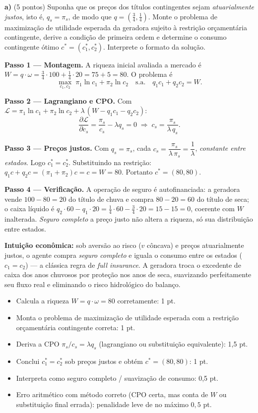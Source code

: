 \textbf{a)} (5 pontos) Suponha que os preços dos títulos contingentes sejam \emph{atuarialmente justos}, isto é, $q_s=\pi_s$, de modo que $q=(\tfrac34,\tfrac14)$. Monte o problema de maximização de utilidade esperada da geradora sujeito à restrição orçamentária contingente, derive a condição de primeira ordem e determine o consumo contingente ótimo $c^{*}=(c_1^{*},c_2^{*})$. Interprete o formato da solução.
\resolucaobox{7.6cm}
\begin{solucao}
\textbf{Passo 1 --- Montagem.} A riqueza inicial avaliada a mercado é $W=q\cdot\omega=\tfrac34\cdot 100+\tfrac14\cdot 20=75+5=80$. O problema é
\[
\max_{c_1,c_2}\;\pi_1\ln c_1+\pi_2\ln c_2\quad\text{s.a.}\quad q_1 c_1+q_2 c_2 = W.
\]

\textbf{Passo 2 --- Lagrangiano e CPO.} Com $\mathcal{L}=\pi_1\ln c_1+\pi_2\ln c_2+\lambda\,(W-q_1 c_1-q_2 c_2)$:
\[
\frac{\partial\mathcal{L}}{\partial c_s}=\frac{\pi_s}{c_s}-\lambda q_s=0\;\Longrightarrow\; c_s=\frac{\pi_s}{\lambda\, q_s}.
\]

\textbf{Passo 3 --- Preços justos.} Com $q_s=\pi_s$, cada $c_s=\dfrac{\pi_s}{\lambda\,\pi_s}=\dfrac{1}{\lambda}$, \emph{constante entre estados}. Logo $c_1^{*}=c_2^{*}$. Substituindo na restrição: $q_1 c+q_2 c=(\pi_1+\pi_2)c=c=W=80$. Portanto $c^{*}=(80,80)$.

\textbf{Passo 4 --- Verificação.} A operação de seguro é autofinanciada: a geradora vende $100-80=20$ do título de chuva e compra $80-20=60$ do título de seca; o caixa líquido é $q_2\cdot 60-q_1\cdot 20=\tfrac14\cdot 60-\tfrac34\cdot 20=15-15=0$, coerente com $W$ inalterada. \emph{Seguro completo} a preço justo não altera a riqueza, só sua distribuição entre estados.

\textbf{Intuição econômica:} sob aversão ao risco ($v$ côncava) e preços atuarialmente justos, o agente compra \emph{seguro completo} e iguala o consumo entre os estados ($c_1=c_2$) --- a clássica regra de \emph{full insurance}. A geradora troca o excedente de caixa dos anos chuvosos por proteção nos anos de seca, suavizando perfeitamente seu fluxo real e eliminando o risco hidrológico do balanço.
\rubricalabel
\begin{itemize}
\item Calcula a riqueza $W=q\cdot\omega=80$ corretamente: 1 pt.
\item Monta o problema de maximização de utilidade esperada com a restrição orçamentária contingente correta: 1 pt.
\item Deriva a CPO $\pi_s/c_s=\lambda q_s$ (lagrangiano ou substituição equivalente): 1{,}5 pt.
\item Conclui $c_1^{*}=c_2^{*}$ sob preços justos e obtém $c^{*}=(80,80)$: 1 pt.
\item Interpreta como seguro completo / suavização de consumo: 0{,}5 pt.
\item Erro aritmético com método correto (CPO certa, mas conta de $W$ ou substituição final errada): penalidade leve de no máximo $0{,}5$ pt.
\end{itemize}
\end{solucao}

